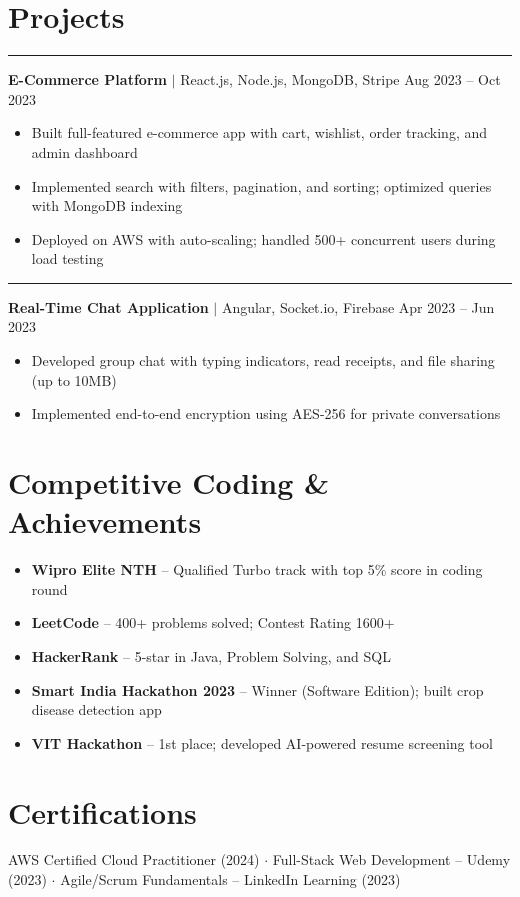\documentclass[10pt,a4paper]{article}
\newcommand{\accentbar}{\color{accent}\rule[-1pt]{2pt}{10pt}\hspace{4pt}}
\begin{document}
\section{Projects}

\accentbar\textbf{E-Commerce Platform} {\footnotesize$\mid$ React.js, Node.js, MongoDB, Stripe} \hfill {\footnotesize Aug 2023 -- Oct 2023}
\begin{itemize}
    \item Built full-featured e-commerce app with cart, wishlist, order tracking, and admin dashboard
    \item Implemented search with filters, pagination, and sorting; optimized queries with MongoDB indexing
    \item Deployed on AWS with auto-scaling; handled 500+ concurrent users during load testing
\end{itemize}

\accentbar\textbf{Real-Time Chat Application} {\footnotesize$\mid$ Angular, Socket.io, Firebase} \hfill {\footnotesize Apr 2023 -- Jun 2023}
\begin{itemize}
    \item Developed group chat with typing indicators, read receipts, and file sharing (up to 10MB)
    \item Implemented end-to-end encryption using AES-256 for private conversations
\end{itemize}

\section{Competitive Coding \& Achievements}

\begin{itemize}
    \item \textbf{Wipro Elite NTH} -- Qualified Turbo track with top 5\% score in coding round
    \item \textbf{LeetCode} -- 400+ problems solved; Contest Rating 1600+
    \item \textbf{HackerRank} -- 5-star in Java, Problem Solving, and SQL
    \item \textbf{Smart India Hackathon 2023} -- Winner (Software Edition); built crop disease detection app
    \item \textbf{VIT Hackathon} -- 1st place; developed AI-powered resume screening tool
\end{itemize}

\section{Certifications}

{\footnotesize AWS Certified Cloud Practitioner (2024) $\cdot$ Full-Stack Web Development -- Udemy (2023) $\cdot$ Agile/Scrum Fundamentals -- LinkedIn Learning (2023)}
\end{document}
